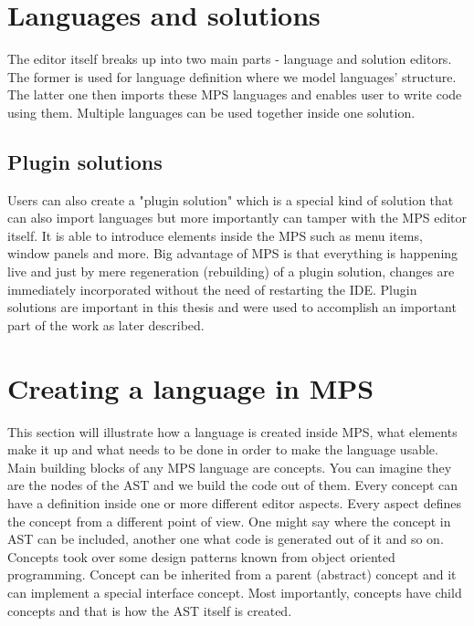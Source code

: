\section{Languages and solutions}

The editor itself breaks up into two main parts - language and solution editors. The former is used for language definition where we model languages' structure. The latter one then imports these MPS languages and enables user to write code using them. Multiple languages can be used together inside one solution.

\subsection{Plugin solutions}

Users can also create a "plugin solution" which is a special kind of solution that can also import languages but more importantly can tamper with the MPS editor itself. It is able to introduce elements inside the MPS such as menu items, window panels and more. Big advantage of MPS is that everything is happening live and just by mere regeneration (rebuilding) of a plugin solution, changes are immediately incorporated without the need of restarting the IDE. Plugin solutions are important in this thesis and were used to accomplish an important part of the work as later described.

\section{Creating a language in MPS}

This section will illustrate how a language is created inside MPS, what elements make it up and what needs to be done in order to make the language usable. 
\\

Main building blocks of any MPS language are concepts. You can imagine they are the nodes of the AST and we build the code out of them. Every concept can have a definition inside one or more different editor aspects. Every aspect defines the concept from a different point of view. One might say where the concept in AST can be included, another one what code is generated out of it and so on. Concepts took over some design patterns known from object oriented programming. Concept can be inherited from a parent (abstract) concept and it can implement a special interface concept. Most importantly, concepts have child concepts and that is how the AST itself is created.
\\

